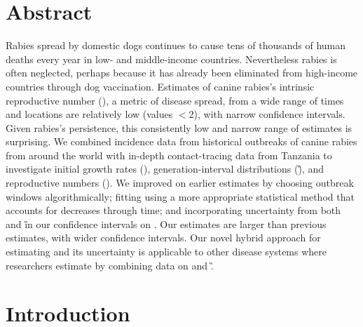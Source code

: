 
\section*{Abstract}

Rabies spread by domestic dogs continues to cause tens of thousands of human deaths every year in low- and middle-income countries. Nevertheless rabies is often neglected, perhaps because it has already been eliminated from high-income countries through dog vaccination.
Estimates of canine rabies's intrinsic reproductive number (\rzero), a metric of disease spread, from a wide range of times and locations are relatively low (values $<2$), with narrow confidence intervals. Given rabies's persistence, this consistently low and narrow range of estimates is surprising.
We combined incidence data from historical outbreaks of canine rabies from around the world with in-depth contact-tracing data from Tanzania to investigate initial growth rates (\littler), generation-interval distributions (\G), and reproductive numbers (\rzero).
We improved on earlier estimates by choosing outbreak windows algorithmically; fitting \littler using a more appropriate statistical method that accounts for decreases through time; and incorporating uncertainty from both \littler and \G in our confidence intervals on \rzero. 
Our \rzero estimates are larger than previous estimates, with wider confidence intervals.
Our novel hybrid approach for estimating \rzero and its uncertainty is applicable to other disease systems where researchers estimate \rzero by combining data on \littler and \G.


\section*{Introduction}

